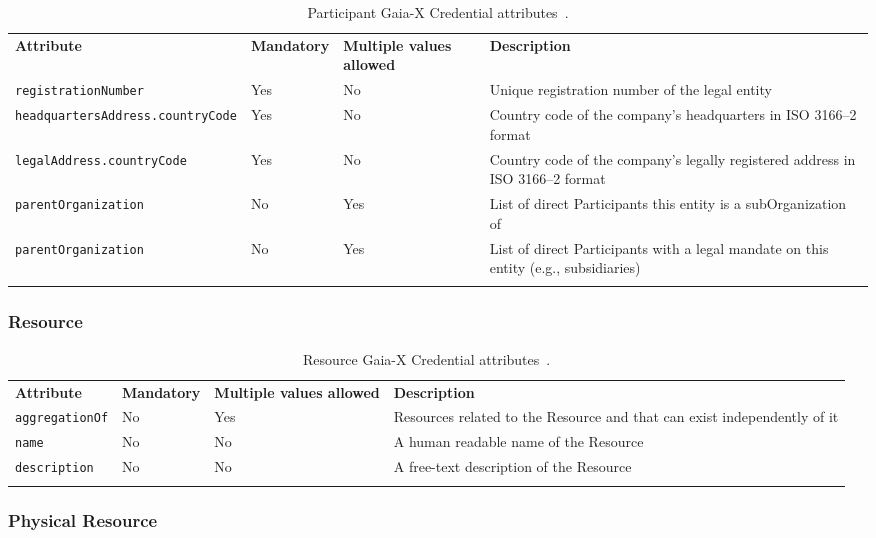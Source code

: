 \begin{longtable}{ |p{4cm}|p{2cm}|p{2cm}|p{7cm}| }
    \hhline{----}
    \textbf{Attribute} & \textbf{Mandatory} & \textbf{Multiple values allowed} & \textbf{Description}\\
    \hhline{----}
    \texttt{registrationNumber} & Yes & No & Unique registration number of the legal entity\\
    \hhline{----}
    \texttt{headquartersAddress.countryCode} & Yes & No & Country code of the company's headquarters in ISO 3166--2 format\\
    \hhline{----}
    \texttt{legalAddress.countryCode} & Yes & No & Country code of the company's legally registered address in ISO 3166--2 format\\
    \hhline{----}
    \texttt{parentOrganization} & No & Yes & List of direct Participants this entity is a subOrganization of\\
    \hhline{----}
    \texttt{parentOrganization} & No & Yes & List of direct Participants with a legal mandate on this entity (e.g., subsidiaries)\\
    \hhline{----}
    \caption{Participant Gaia-X Credential attributes~\cite{gaiax_trust_framework}.}
    \label{tab:participant}
\end{longtable}

\subsubsection{Resource}

\begin{longtable}{ |p{4cm}|p{2cm}|p{2cm}|p{7cm}| }
    \hhline{----}
    \textbf{Attribute} & \textbf{Mandatory} & \textbf{Multiple values allowed} & \textbf{Description}\\
    \hhline{----}
    \texttt{aggregationOf} & No & Yes & Resources related to the Resource and that can exist independently of it\\
    \hhline{----}
    \texttt{name} & No & No & A human readable name of the Resource\\
    \hhline{----}
    \texttt{description} & No & No & A free-text description of the Resource\\
    \hhline{----}
    \caption{Resource Gaia-X Credential attributes~\cite{gaiax_trust_framework}.}
    \label{tab:resource}
\end{longtable}

\subsubsection{Physical Resource}

